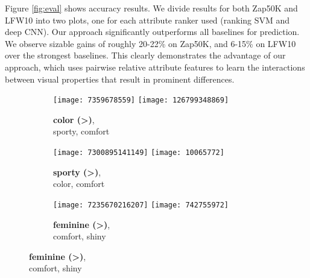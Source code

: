 \documentclass[10pt,twocolumn,letterpaper]{article}
\begin{document}
Figure \ref{fig:eval} shows accuracy results. We divide results for both Zap50K and LFW10 into two plots, one for each attribute ranker used (ranking SVM and deep CNN). Our approach significantly outperforms all baselines for prediction. We observe sizable gains of roughly 20-22\% on Zap50K, and 6-15\% on LFW10 over the strongest baselines. This clearly demonstrates the advantage of our approach, which uses pairwise relative attribute features to learn the interactions between visual properties that result in prominent differences.

\begin{figure}[t]
    \centering
    \captionsetup[subfigure]{justification=centering,font=footnotesize,labelfont=footnotesize}
    
    \begin{subfigure}[c]{0.3\linewidth}
        \centering
        \texttt{[image: 7359678559]}
        \texttt{[image: 126799348869]}
        \caption{\textbf{color (\textgreater)},\\ sporty, comfort}
        \label{fig:zap1}
    \end{subfigure}
    \hfill
    \begin{subfigure}[c]{0.3\linewidth}
        \centering
        \texttt{[image: 7300895141149]}
        \texttt{[image: 10065772]}
        \caption{\textbf{sporty (\textgreater)},\\ color, comfort}
        \label{fig:zap2}
    \end{subfigure}
    \hfill
    \begin{subfigure}[c]{0.3\linewidth}
        \centering
        \texttt{[image: 7235670216207]}
        \texttt{[image: 742755972]}
        \caption{\textbf{feminine (\textgreater)},\\ comfort, shiny}
        \label{fig:zap6}
    \end{subfigure}
    
    \vspace{0.25cm}
    

\end{figure}
\end{document}
